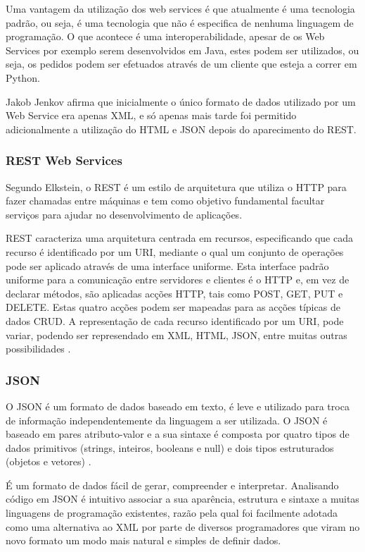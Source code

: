 \documentclass[11pt,twoside,a4paper]{report}
\begin{document}
Uma vantagem da utilização dos web services é que atualmente é uma tecnologia padrão, ou seja, é uma tecnologia que não é especifica de nenhuma linguagem de programação. O que acontece é uma interoperabilidade, apesar de os Web Services por exemplo serem desenvolvidos em Java, estes podem ser utilizados, ou seja, os pedidos podem ser efetuados através de um cliente que esteja a correr em Python.

Jakob Jenkov \cite{wsjakob} afirma que inicialmente o único formato de dados utilizado por um Web Service era apenas \gls{XML}, e só apenas
mais tarde foi permitido adicionalmente a utilização do \gls{HTML} e \gls{JSON} depois do aparecimento do \gls{REST}.

\subsubsection{ REST Web Services}

Segundo Elkstein\cite{whatisrest}, o \gls{REST} é um estilo de arquitetura que utiliza o \gls{HTTP} para fazer chamadas entre máquinas e tem como objetivo fundamental facultar serviços para ajudar no desenvolvimento de aplicações.

\gls{REST} caracteriza uma arquitetura centrada em recursos, especificando que cada recurso é identificado por um \gls{URI}, mediante o qual um conjunto de operações pode ser aplicado através de uma interface uniforme. Esta interface padrão uniforme para a comunicação entre servidores e clientes é o \gls{HTTP} e, em vez de declarar métodos, são aplicadas acções \gls{HTTP}, tais como POST, GET, PUT e DELETE. Estas quatro acções podem ser mapeadas para as acções típicas de dados \gls{CRUD}. A representação de cada recurso identificado por um URI, pode variar, podendo ser represendado em \gls{XML}, \gls{HTML}, \gls{JSON}, entre muitas outras possibilidades \cite{restwebservices}.


\subsubsection{JSON}

O \gls{JSON} é um formato de dados baseado em texto, é leve e utilizado para troca de informação independentemente da linguagem a ser utilizada. O \gls{JSON} é baseado em pares atributo-valor e a sua sintaxe é composta por quatro tipos de dados primitivos (strings, inteiros, booleans e null) e dois tipos estruturados (objetos e vetores) \cite{json}. 
\par
É um formato de dados  fácil de gerar, compreender e interpretar. Analisando código em \gls{JSON} é intuitivo associar a sua aparência, estrutura e sintaxe a muitas linguagens de programação existentes, razão pela qual foi facilmente adotada como uma alternativa ao \gls{XML} por parte de diversos programadores que viram no novo formato um modo mais natural e simples de definir dados.
\end{document}
